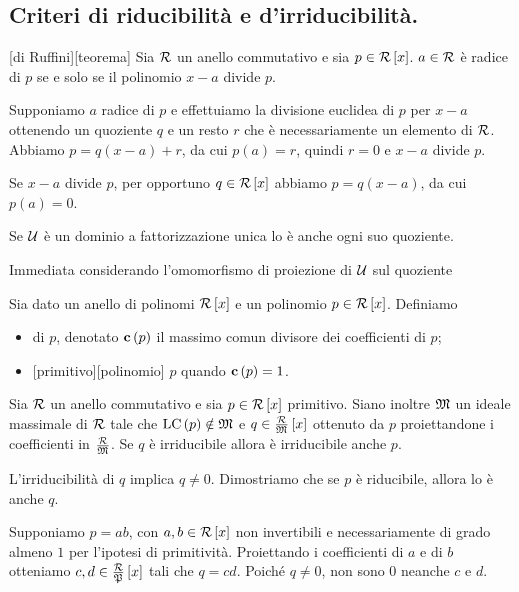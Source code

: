 \subsection{Criteri di riducibilit\`a e d'irriducibilit\`a.}\label{CriteriDIrriducibilita}
\begin{Theorem}
	[di Ruffini][teorema] Sia $\mathcal{R}$ un anello commutativo e sia $p \in \mathcal{R} \left [ x \right ]$. $a \in \mathcal{R}$ \`e radice di $p$ se e solo se il polinomio $x - a$ divide $p$.
\end{Theorem}
\Proof Supponiamo $a$ radice di $p$ e effettuiamo la divisione euclidea di $p$ per $x - a$ ottenendo un quoziente $q$ e un resto $r$ che \`e necessariamente un elemento di $\mathcal{R}$. Abbiamo $p = q(x - a) + r$, da cui $p(a) = r$, quindi $r = 0$ e $x - a$ divide $p$.
\par Se $x - a$ divide $p$, per opportuno $q \in \mathcal{R} \left [ x \right ]$ abbiamo $p = q(x - a)$, da cui $p(a) = 0$. \EndProof
\begin{Theorem}
	Se $\mathcal{U}$ \`e un dominio a fattorizzazione unica lo \`e anche ogni suo quoziente.
\end{Theorem}
\Proof Immediata considerando l'omomorfismo di proiezione di $\mathcal{U}$ sul quoziente \EndProof
\begin{Definition}
	Sia dato un anello di polinomi $\mathcal{R} \left [ x \right ]$ e un polinomio $p \in \mathcal{R} \left [ x \right ]$. Definiamo
	\begin{itemize}
		\item {} di $p$, denotato $\mathbf{c}\left ( p \right )$ il massimo comun divisore dei coefficienti di $p$;
		\item {}[primitivo][polinomio] $p$ quando $\mathbf{c}\left ( p \right ) = 1$.
	\end{itemize}
\end{Definition}
\begin{Theorem}
	Sia $\mathcal{R}$ un anello commutativo e sia $p \in \mathcal{R} \left [ x \right ]$ primitivo. Siano inoltre $\mathfrak{M}$ un ideale massimale di $\mathcal{R}$ tale che $\text{LC} \left ( p \right ) \notin \mathfrak{M}$ e $q \in \frac{\mathcal{R}}{\mathfrak{M}} \left [ x \right ]$ ottenuto da $p$ proiettandone i coefficienti in $\frac{\mathcal{R}}{\mathfrak{M}}$. Se $q$ \`e irriducibile allora \`e irriducibile anche $p$.
\end{Theorem}
\Proof L'irriducibilit\`a di $q$ implica $q \neq 0$. Dimostriamo che se $p$ \`e riducibile, allora lo \`e anche $q$.
\par Supponiamo $p = ab$, con $a,b \in \mathcal{R} \left [ x \right ]$ non invertibili e necessariamente di grado almeno $1$ per l'ipotesi di primitivit\`a. Proiettando i coefficienti di $a$ e di $b$ otteniamo $c,d \in \frac{\mathcal{R}}{\mathfrak{P}} \left [ x \right ]$ tali che $q = cd$. Poich\'e $q \neq 0$, non sono $0$ neanche $c$ e $d$.
